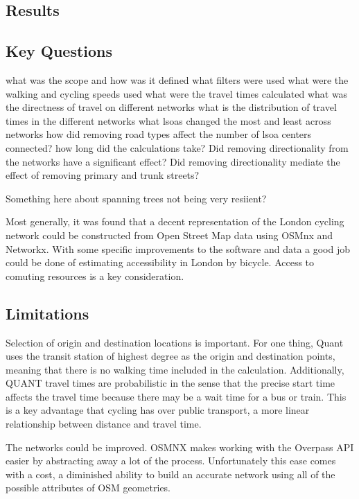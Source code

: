 \subsection{Results}

\subsection{Key Questions}
what was the scope and how was it defined
what filters were used
what were the walking and cycling speeds used
what were the travel times calculated
what was the directness of travel on different networks
what is the distribution of travel times in the different networks
what lsoas changed the most and least across networks
how did removing road types affect the number of lsoa centers connected?
how long did the calculations take?
Did removing directionality from the networks have a significant effect?
Did removing directionality mediate the effect of removing primary and trunk streets?



Something here about spanning trees not being very resiient? 

Most generally, it was found that a decent representation of the London cycling network could be constructed from Open Street Map data using OSMnx and Networkx. With some specific improvements to the software and data a good job could be done of estimating accessibility in London by bicycle. Access to comuting resources is a key consideration.

\subsection{Limitations}

Selection of origin and destination locations is important. For one thing, Quant uses the transit station of highest degree as the origin and destination points, meaning that there is no walking time included in the calculation. Additionally, QUANT travel times are probabilistic in the sense that the precise start time affects the travel time because there may be a wait time for a bus or train. This is a key advantage that cycling has over public transport, a more linear relationship between distance and travel time. 

The networks could be improved. OSMNX makes working with the Overpass API easier by abstracting away a lot of the process. Unfortunately this ease comes with a cost, a diminished ability to build an accurate network using all of the possible attributes of OSM geometries. 

